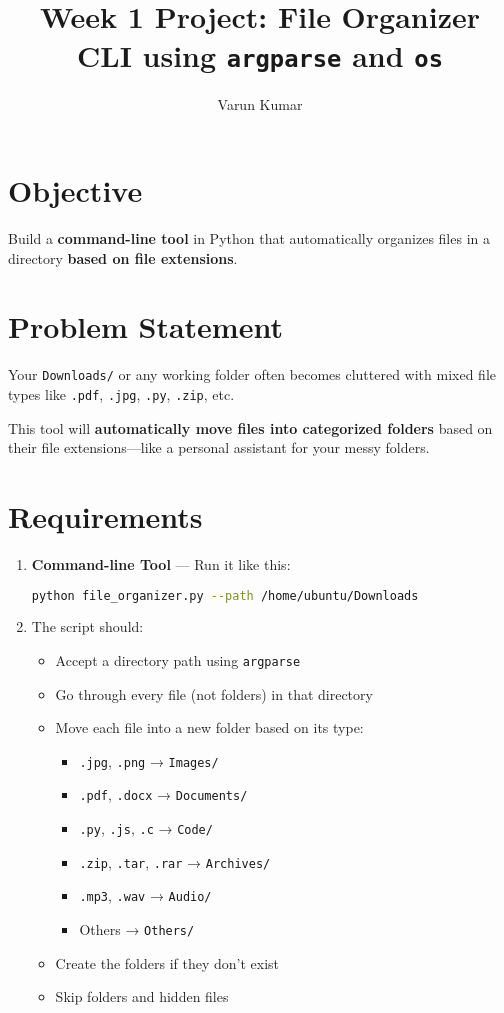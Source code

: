 \documentclass[14pt]{extarticle}
\title{Week 1 Project: File Organizer CLI using \texttt{argparse} and \texttt{os}}
\author{Varun Kumar}
\date{}
\begin{document}
\maketitle

\section*{Objective}
Build a \textbf{command-line tool} in Python that automatically organizes files in a directory \textbf{based on file extensions}.

\section*{Problem Statement}
Your \texttt{Downloads/} or any working folder often becomes cluttered with mixed file types like \texttt{.pdf}, \texttt{.jpg}, \texttt{.py}, \texttt{.zip}, etc.

This tool will \textbf{automatically move files into categorized folders} based on their file extensions—like a personal assistant for your messy folders.

\section*{Requirements}
\begin{enumerate}[label=\arabic*.]
    \item \textbf{Command-line Tool} — Run it like this:
    \begin{lstlisting}[language=bash]
python file_organizer.py --path /home/ubuntu/Downloads
    \end{lstlisting}

    \item The script should:
    \begin{itemize}
        \item Accept a directory path using \texttt{argparse}
        \item Go through every file (not folders) in that directory
        \item Move each file into a new folder based on its type:
        \begin{itemize}
            \item \texttt{.jpg}, \texttt{.png} → \texttt{Images/}
            \item \texttt{.pdf}, \texttt{.docx} → \texttt{Documents/}
            \item \texttt{.py}, \texttt{.js}, \texttt{.c} → \texttt{Code/}
            \item \texttt{.zip}, \texttt{.tar}, \texttt{.rar} → \texttt{Archives/}
            \item \texttt{.mp3}, \texttt{.wav} → \texttt{Audio/}
            \item Others → \texttt{Others/}
        \end{itemize}
        \item Create the folders if they don’t exist
        \item Skip folders and hidden files
    \end{itemize}
\end{enumerate}
\end{document}
